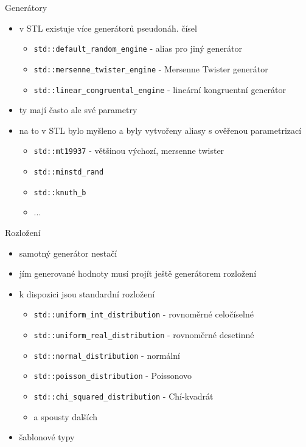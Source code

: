 \documentclass{beamer}
\begin{document}
\begin{xframe}{Generátory}
	\begin{itemize}
		\item v STL existuje více generátorů pseudonáh. čísel
			\begin{itemize}
				\item \texttt{std::default\_random\_engine} - alias pro jiný generátor
				\item \texttt{std::mersenne\_twister\_engine} - Mersenne Twister generátor
				\item \texttt{std::linear\_congruental\_engine} - lineární kongruentní generátor
				
			\end{itemize}
		\item ty mají často ale své parametry
		\item na to v STL bylo myšleno a byly vytvořeny aliasy s ověřenou parametrizací
			\begin{itemize}
				\item \texttt{std::mt19937} - většinou výchozí, mersenne twister
				\item \texttt{std::minstd\_rand}
				\item \texttt{std::knuth\_b}
				\item ...
			\end{itemize}
	\end{itemize}
\end{xframe}


\begin{xframe}{Rozložení}
	\begin{itemize}
		\item samotný generátor nestačí
		\item jím generované hodnoty musí projít ještě generátorem rozložení
		\item k dispozici jsou standardní rozložení
			\begin{itemize}
				\item \texttt{std::uniform\_int\_distribution} - rovnoměrné celočíselné
				\item \texttt{std::uniform\_real\_distribution} - rovnoměrné desetinné
				\item \texttt{std::normal\_distribution} - normální
				\item \texttt{std::poisson\_distribution} - Poissonovo
				\item \texttt{std::chi\_squared\_distribution} - Chí-kvadrát
				\item a spousty dalších
			\end{itemize}
		\item šablonové typy
	\end{itemize}
\end{xframe}
\end{document}
